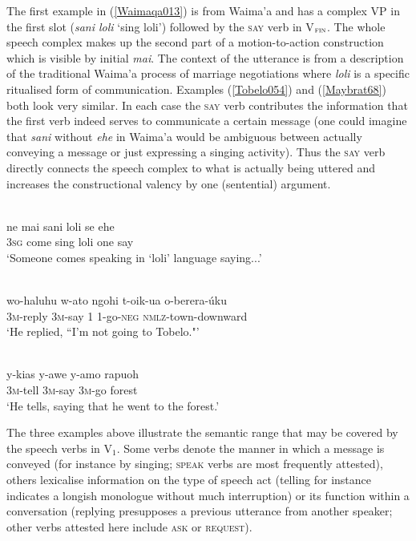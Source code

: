 The first example in (\ref{Waimaqa013}) is from Waima'a and has a complex VP in the first slot (\textit{sani loli} `sing loli') followed by the \textsc{say} verb in V$_{\textsc{fin}}$. The whole speech complex makes up the second part of a motion-to-action construction which is visible by initial \textit{mai}. The context of the utterance is from a description of the traditional Waima'a process of marriage negotiations where \textit{loli} is a specific ritualised form of communication. Examples (\ref{Tobelo054}) and (\ref{Maybrat68}) both look very similar. In each case the \textsc{say} verb contributes the information that the first verb indeed serves to communicate a certain message (one could imagine that \textit{sani} without \textit{ehe} in Waima'a would be ambiguous between actually conveying a message or just expressing a singing activity). Thus the \textsc{say} verb directly connects the speech complex to what is actually being uttered and increases the constructional valency by one (sentential) argument. 

\ea \label{Waimaqa013}
\\
\gll ne mai sani loli se ehe \\
\textsc{3}\textsc{sg} come sing loli one say \\
\glft `Someone comes speaking in `loli' language saying...'\\ 
\z

\ea \label{Tobelo054}
\\
\gll wo-haluhu w-ato ngohi t-oik-ua o-berera-úku \\
\textsc{3}\textsc{m}-reply \textsc{3}\textsc{m}-say \textsc{1} \textsc{1}-go-\textsc{neg} \textsc{nmlz}-town-downward \\
\glft `He replied, ``I'm not going to Tobelo."'\\ 
\z

\ea \label{Maybrat68}
\\
\gll y-kias y-awe y-amo rapuoh \\
\textsc{3}\textsc{m}-tell \textsc{3}\textsc{m}-say \textsc{3}\textsc{m}-go forest \\
\glft `He tells, saying that he went to the forest.'\\ 
\z

The three examples above illustrate the semantic range that may be covered by the speech verbs in V$_{1}$. Some verbs denote the manner in which a message is conveyed (for instance by singing; \textsc{speak} verbs are most frequently attested), others lexicalise information on the type of speech act (telling for instance indicates a longish monologue without much interruption) or its function within a conversation (replying presupposes a previous utterance from another speaker; other verbs attested here include \textsc{ask} or \textsc{request}).

